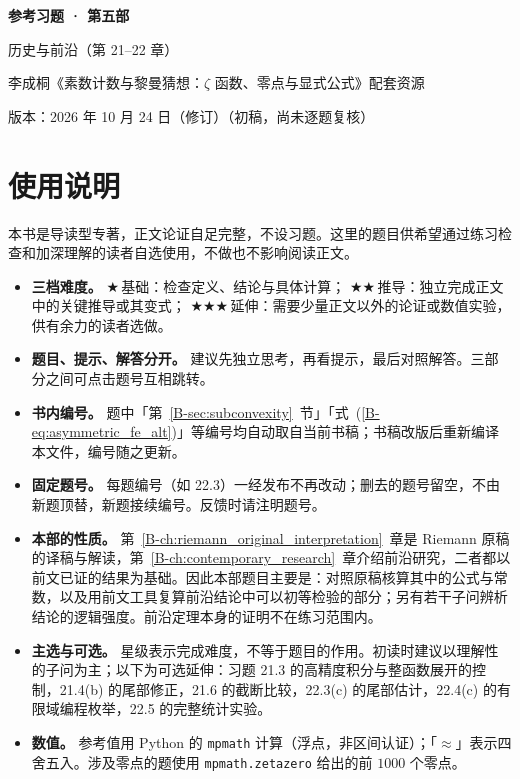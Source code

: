 \documentclass[11pt,a4paper]{article}
\newcommand{\bref}[1]{\ref*{B-#1}}
\newcommand{\lvI}{$\bigstar$\,基础}
\newcommand{\lvII}{$\bigstar\bigstar$\,推导}
\newcommand{\lvIII}{$\bigstar\bigstar\bigstar$\,延伸}
\newcommand{\versiondate}{2026 年 10 月 24 日（修订）}
\begin{document}
\begin{center}
{\LARGE\bfseries 参考习题 · 第五部\par}
\vspace{0.6em}
{\large 历史与前沿（第 21–22 章）\par}
\vspace{0.6em}
{\normalsize 李成桐《素数计数与黎曼猜想：$\zeta$ 函数、零点与显式公式》配套资源\par}
\vspace{0.3em}
{\small 版本：\versiondate（初稿，尚未逐题复核）\par}
\end{center}

\vspace{0.8em}
\section*{使用说明}

本书是导读型专著，正文论证自足完整，不设习题。这里的题目供希望通过练习检查和加深理解的读者自选使用，不做也不影响阅读正文。

\begin{itemize}
  \item \textbf{三档难度。}
    \lvI：检查定义、结论与具体计算；
    \lvII：独立完成正文中的关键推导或其变式；
    \lvIII：需要少量正文以外的论证或数值实验，供有余力的读者选做。
  \item \textbf{题目、提示、解答分开。}
    建议先独立思考，再看提示，最后对照解答。三部分之间可点击题号互相跳转。
  \item \textbf{书内编号。}
    题中「第~\bref{sec:subconvexity}~节」「式~(\bref{eq:asymmetric_fe_alt})」等编号均自动取自当前书稿；书稿改版后重新编译本文件，编号随之更新。
  \item \textbf{固定题号。}
    每题编号（如 22.3）一经发布不再改动；删去的题号留空，不由新题顶替，新题接续编号。反馈时请注明题号。
  \item \textbf{本部的性质。}
    第~\bref{ch:riemann_original_interpretation}~章是 Riemann 原稿的译稿与解读，第~\bref{ch:contemporary_research}~章介绍前沿研究，二者都以前文已证的结果为基础。因此本部题目主要是：对照原稿核算其中的公式与常数，以及用前文工具复算前沿结论中可以初等检验的部分；另有若干子问辨析结论的逻辑强度。前沿定理本身的证明不在练习范围内。
  \item \textbf{主选与可选。}
    星级表示完成难度，不等于题目的作用。初读时建议以理解性的子问为主；以下为可选延伸：习题 21.3 的高精度积分与整函数展开的控制，21.4(b) 的尾部修正，21.6 的截断比较，22.3(c) 的尾部估计，22.4(c) 的有限域编程枚举，22.5 的完整统计实验。
  \item \textbf{数值。}
    参考值用 Python 的 \texttt{mpmath} 计算（浮点，非区间认证）；「$\approx$」表示四舍五入。涉及零点的题使用 \texttt{mpmath.zetazero} 给出的前 $1000$ 个零点。
\end{itemize}
\end{document}
